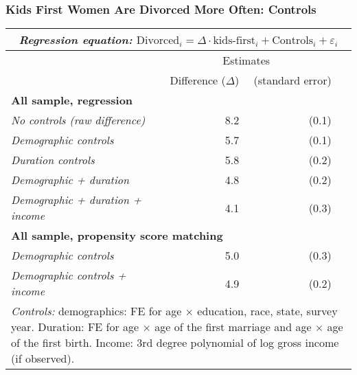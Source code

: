 \documentclass[aspectratio=169]{beamer}
\begin{document}
\begin{frame}[plain,label=emp-controls]
\frametitle{Kids First Women Are Divorced More Often: Controls}
\begin{center}
\begin{tabular}{l r r r }
\multicolumn{4}{c}{\textit{Regression equation:} $\text{Divorced}_i = \Delta \cdot \text{kids-first}_i + \text{Controls}_i + \varepsilon_i$} \\\hline
\hline
& \multicolumn{2}{c}{Estimates}  \\
& Difference ($\Delta$) & (standard error)  \\\hline
\multicolumn{4}{l}{\textbf{All sample, regression}} \\\hline
\textit{No controls (raw difference) }& 8.2 & (0.1)  \\
\textit{Demographic controls }& 5.7 & (0.1)  \\
\textit{Duration controls} &  5.8 & (0.2)  \\
\textit{Demographic + duration} &  4.8 & (0.2)  \\
\textit{Demographic + duration + income} & 4.1 & (0.3)  \\\hline
\multicolumn{4}{l}{\textbf{All sample, propensity score matching}} \\\hline
\textit{Demographic controls} & 5.0 & (0.3)  \\
\textit{Demographic controls + income} & 4.9 & (0.2)  \\\hline
\multicolumn{4}{p{0.825\linewidth}}{\footnotesize \textit{Controls:} demographics: FE for age $\times$ education, race, state, survey year. Duration: FE for age $\times$ age of the first marriage and age $\times$ age of the first birth.  Income: 3rd degree polynomial of log gross income (if observed).}\\\hline\hline
\end{tabular}
\end{center}
\vspace{-0.5cm}
\hyperlink{dt_more}{} 
\end{frame}
\end{document}
